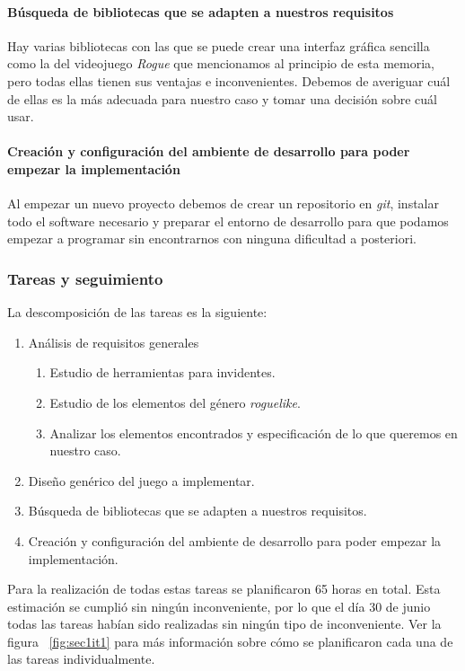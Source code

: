 \paragraph{Búsqueda de bibliotecas que se adapten a nuestros requisitos} Hay varias bibliotecas con las que se puede crear una interfaz gráfica sencilla como la del videojuego \textit{Rogue} que mencionamos al principio de esta memoria, pero todas ellas tienen sus ventajas e inconvenientes. Debemos de averiguar cuál de ellas es la más adecuada para nuestro caso y tomar una decisión sobre cuál usar.

\paragraph{Creación y configuración del ambiente de desarrollo para poder empezar la implementación} Al empezar un nuevo proyecto debemos de crear un repositorio en \textit{git}, instalar todo el software necesario y preparar el entorno de desarrollo para que podamos empezar a programar sin encontrarnos con ninguna dificultad a posteriori.

\subsubsection{Tareas y seguimiento}

La descomposición de las tareas es la siguiente:

\begin{enumerate}[label=\bfseries WBS 1.\arabic*]
  \item Análisis de requisitos generales
    \begin{enumerate}[label=\bfseries WBS 1.1.\arabic*]
      \item Estudio de herramientas para invidentes.
      \item Estudio de los elementos del género \textit{roguelike}.
      \item Analizar los elementos encontrados y especificación de lo que queremos en nuestro caso.
    \end{enumerate}
  \item Diseño genérico del juego a implementar.
  \item Búsqueda de bibliotecas que se adapten a nuestros requisitos.
  \item Creación y configuración del ambiente de desarrollo para poder empezar la implementación.
\end{enumerate}

Para la realización de todas estas tareas se planificaron 65 horas en total. Esta estimación se cumplió sin ningún inconveniente, por lo que el día 30 de junio todas las tareas habían sido realizadas sin ningún tipo de inconveniente. Ver la figura ~\ref{fig:sec1it1} para más información sobre cómo se planificaron cada una de las tareas individualmente.

